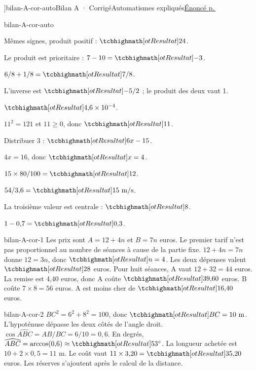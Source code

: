 \editionPage[\pdfbookmark[0]{Corrigés des bilans}{bm-bilan-A-cor-auto-parent}]{bilan-A-cor-auto}{Bilan A · Corrigé}{Automatismes expliqués}{\hyperref[bilan-A-auto]{Énoncé p.\,\pageref*{bilan-A-auto}}}
\begin{blocEdition}{bilan-A-cor-auto}
\begin{questions}
\item Mêmes signes, produit positif : $\res{24}$.
\item Le produit est prioritaire : $7-10=\res{-3}$.
\item $6/8+1/8=\res{7/8}$.
\item L’inverse est $\res{-5/2}$ ; le produit des deux vaut 1.
\item $\res{4{,}6\times10^{-4}}$.
\item $11^2=121$ et $11\ge0$, donc $\res{11}$.
\item Distribuer 3 : $\res{6x-15}$.
\item $4x=16$, donc $\res{x=4}$.
\item $15\times80/100=\res{12}$.
\item $54/3{,}6=\res{15\ \mathrm{m/s}}$.
\item La troisième valeur est centrale : $\res8$.
\item $1-0{,}7=\res{0{,}3}$.\end{questions}
\end{blocEdition}
\begin{blocEdition}{bilan-A-cor-1}
Les prix sont $A=12+4n$ et $B=7n$ euros. Le premier tarif n’est pas proportionnel au nombre de séances à cause de la partie fixe.
$12+4n=7n$ donne $12=3n$, donc $\res{n=4}$. Les deux dépenses valent $\res{28}$ euros.
Pour huit séances, A vaut $12+32=44$ euros. La remise est 4,40 euros, donc A coûte $\res{39{,}60}$ euros. B coûte $7\times8=56$ euros. A est moins cher de $\res{16{,}40}$ euros.
\end{blocEdition}
\begin{blocEdition}{bilan-A-cor-2}
$BC^2=6^2+8^2=100$, donc $\res{BC=10\ \mathrm m}$. L’hypoténuse dépasse les deux côtés de l’angle droit.
$\cos\widehat{ABC}=AB/BC=6/10=0{,}6$. En degrés, $\widehat{ABC}=\arccos(0{,}6)\approx\res{53^\circ}$.
La longueur achetée est $10+2\times0{,}5=11$ m. Le coût vaut $11\times3{,}20=\res{35{,}20}$ euros. Les réserves s’ajoutent après le calcul de la distance.\label{fig-bilan-A-cor-2}

\end{blocEdition}
